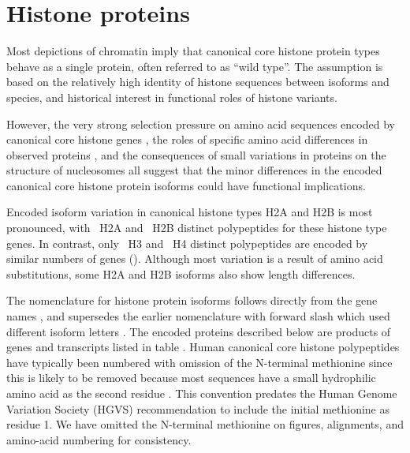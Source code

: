 \section{Histone proteins}
  Most depictions of chromatin imply that
  canonical core histone protein types behave as a single protein,
  often referred to as ``wild type''.
  The assumption is based on the relatively high identity of histone sequences
  between isoforms and species,
  and historical interest in functional roles of histone variants.

  However, the very strong selection pressure on
  amino acid sequences encoded by canonical core histone genes \citep{NeiRooney2005},
  the roles of specific amino acid differences in observed proteins \citep{MazeAllis2014},
  and the consequences of small variations in proteins on the structure of nucleosomes \citep{KurumizakaCOSB2013}
  all suggest that the minor differences in the encoded canonical core histone protein isoforms
  could have functional implications.

  Encoded isoform variation in canonical histone types H2A and H2B is most pronounced,
  with \HTwoAUniqueProteins{}~H2A and \HTwoBUniqueProteins{}~H2B distinct polypeptides
  for these histone type genes.
  In contrast, only \HThreeUniqueProteins{}~H3 and \HFourUniqueProteins{}~H4
  distinct polypeptides are encoded by similar numbers of genes ().
  Although most variation is a result of amino acid substitutions,
  some H2A and H2B isoforms also show length differences.

  The nomenclature for histone protein isoforms follows directly
  from the gene names \citep{Marzluff02},
  and supersedes the earlier nomenclature with forward slash which used different isoform letters
  \citep{AlbigGenomics1997,AlbigHumangen1997}.
  The encoded proteins described below are products of genes and transcripts listed
  in table .
  Human canonical core histone polypeptides have typically been numbered
  with omission of the N-terminal methionine
  since this is likely to be removed because most sequences have
  a small hydrophilic amino acid as the second residue \citep{XiaoPeiBiochem2010}.
  This convention predates the Human Genome Variation Society (HGVS) recommendation
  to include the initial methionine as residue 1.
  We have omitted the N-terminal methionine on figures, alignments,
  and amino-acid numbering for consistency.


